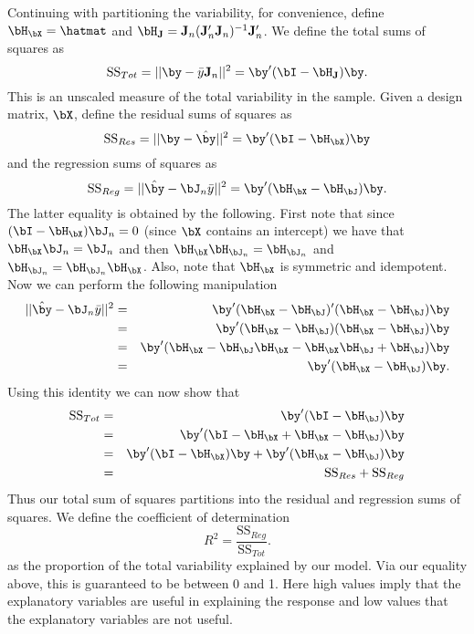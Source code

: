 Continuing with partitioning the variability, for convenience, define $\bH_{\bX}= \hatmat$ and $\bH_{\bf J} =  {\bf J}_n ({\bf J}_n' {\bf J}_n)^{-1} {\bf J}_n'$. 
We define the total sums of squares as
$$
\mbox{SS}_{Tot} = ||\by - \bar y {\bf J}_n ||^2 = \by' (\bI - \bH_{\bf J}) \by.
$$
This is an unscaled measure of the total variability in the
sample. Given a design matrix, $\bX$, define the residual 
sums of squares as
$$
\mbox{SS}_{Res} = ||\by - \hat \by||^2 = \by' (\bI - \bH_{\bX}) \by
$$
and the regression sums of squares as 
$$
\mbox{SS}_{Reg} = ||\hat \by - \bJ_n \bar y||^2 = \by' (\bH_{\bX} - \bH_{\bJ}) \by.
$$
The latter equality is obtained by the following. First note that since
$(\bI - \bH_{\bX})\bJ_n = 0$ (since $\bX$ contains an intercept) we have that
$\bH_{\bX} \bJ_n = \bJ_n$ and then $\bH_{\bX} \bH_{\bJ_n} = \bH_{\bJ_n}$
and $\bH_{\bJ_n} = \bH_{\bJ_n} \bH_{\bX}$.
Also, note that $\bH_{\bX}$ is symmetric and idempotent. 
Now we can perform the following manipulation
\begin{eqnarray*}
||\hat \by - \bJ_n \bar y||^2 & = & 
\by' (\bH_{\bX} - \bH_{\bJ})' (\bH_{\bX} - \bH_{\bJ})\by \\
& = & \by' (\bH_{\bX} - \bH_{\bJ}) (\bH_{\bX} - \bH_{\bJ})\by \\ 
& = & \by' (\bH_{\bX} - \bH_{\bJ}\bH_{\bX} - \bH_{\bX} \bH_{\bJ} + \bH_{\bJ}) \by \\
& = & \by' (\bH_{\bX} - \bH_{\bJ}) \by.
\end{eqnarray*}
Using this identity we can now show that
\begin{eqnarray*}
\mbox{SS}_{Tot} & = & \by' (\bI - \bH_{\bJ}) \by \\
& = & \by' (\bI - \bH_{\bX} + \bH_{\bX} - \bH_{\bJ}) \by \\
& = & \by' (\bI - \bH_{\bX}) \by + \by' (\bH_{\bX} - \bH_{\bJ}) \by \\
& = & \mbox{SS}_{Res} + \mbox{SS}_{Reg}
\end{eqnarray*}
Thus our total sum of squares partitions into the residual and regression sums of squares.
We define the coefficient of determination 
$$
R^2 = \frac{\mbox{SS}_{Reg}}{\mbox{SS}_{Tot}}.
$$
as the proportion of the total variability explained by our model. Via our equality above,
this is guaranteed to be between 0 and 1. Here high values imply that the explanatory variables are useful in explaining the response and low values that the explanatory variables are not useful.

